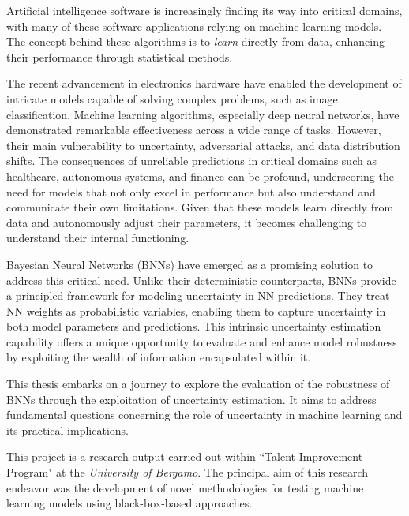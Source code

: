 Artificial intelligence software is increasingly finding its way into critical domains, with many of these software applications relying on machine learning models. The concept behind these algorithms is to \textit{learn} directly from data, enhancing their performance through statistical methods.

The recent advancement in electronics hardware have enabled the development of intricate models capable of solving complex problems, such as image classification. Machine learning algorithms, especially deep neural networks, have demonstrated remarkable effectiveness across a wide range of tasks. However, their main vulnerability to uncertainty, adversarial attacks, and data distribution shifts. 
The consequences of unreliable predictions in critical domains such as healthcare, autonomous systems, and finance can be profound, underscoring the need for models that not only excel in performance but also understand and communicate their own limitations.
Given that these models learn directly from data and autonomously adjust their parameters, it becomes challenging to understand their internal functioning.

Bayesian Neural Networks (BNNs) have emerged as a promising solution to address this critical need. Unlike their deterministic counterparts, BNNs provide a principled framework for modeling uncertainty in NN predictions. They treat NN weights as probabilistic variables, enabling them to capture uncertainty in both model parameters and predictions. This intrinsic uncertainty estimation capability offers a unique opportunity to evaluate and enhance model robustness by exploiting the wealth of information encapsulated within it.

This thesis embarks on a journey to explore the evaluation of the robustness of BNNs through the exploitation of uncertainty estimation. It aims to address fundamental questions concerning the role of uncertainty in machine learning and its practical implications.

This project is a research output carried out within ``Talent Improvement Program" at the \textit{University of Bergamo}. The principal aim of this research endeavor was the development of novel methodologies for testing machine learning models using black-box-based approaches.